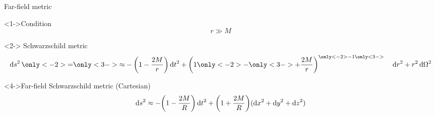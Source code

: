 \documentclass{beamer}
\let\svthefootnote\thefootnote
\newcommand\blankfootnote[1]{%
  \let\thefootnote\relax\footnotetext{#1}%
  \let\thefootnote\svthefootnote%
}
\begin{document}
\begin{frame}{Far-field metric}

\begin{block}<1->{Condition}
\begin{displaymath}
  r \gg M
\end{displaymath}
\end{block}

\begin{block}<2->{ Schwarzschild metric}
\begin{displaymath}
  \dd{s}^2 \only<-2>{{=}} \only<3->{{\approx}}
 -\qty(1 - \frac{2M}{r}) \dd{t}^2 +
  \qty(1 \only<-2>{-} \only<3->{+} \frac{2M}{r})^{\only<-2>{-1}\only<3->{\phantom{-1}}} \dd{r}^2 +
  r^2 \dd{\Omega}^2
\end{displaymath}
\end{block}

\begin{block}<4->{Far-field Schwarzschild metric (Cartesian)}
\begin{displaymath}
  \dd{s}^2 \approx
 -\qty(1 - \frac{2M}{R}) \dd{t}^2 +
  \qty(1 + \frac{2M}{R}) (\dd{x}^2 + \dd{y}^2 + \dd{z}^2)
\end{displaymath}
\end{block}


\blankfootnote{\textcite[pp. 263]{Schutz}}



\end{frame}

\end{document}
